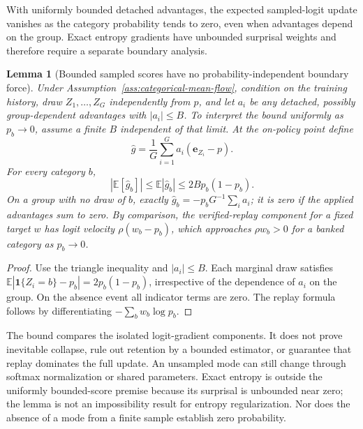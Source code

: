 \documentclass{article}
\newcommand{\enforcehalffinalproseline}{%
  \setlength{\parfillskip}{0pt plus .20\linewidth}}
\newcommand{\1}{\mathbf 1}
\newcommand{\E}{\mathbb E}
\newtheorem{lemma}{Lemma}[section]
\theoremstyle{remark}
\theoremstyle{definition}
\theoremstyle{plain}
\begin{document}
With uniformly bounded detached advantages, the expected sampled-logit
update vanishes as the category probability tends to zero, even when
advantages depend on the group. Exact entropy gradients have unbounded
surprisal weights and therefore require a separate boundary analysis.

\begin{lemma}[Bounded sampled scores have no probability-independent boundary force]
\enforcehalffinalproseline
\label{lem:sampled-score-bound}
Under Assumption~\ref{ass:categorical-mean-flow}, condition on the training history, draw
$Z_1,\ldots,Z_G$ independently from $p$, and let $a_i$ be any detached,
possibly group-dependent advantages with $|a_i|\le B$. To interpret the
bound uniformly as $p_b\to0$, assume a finite $B$ independent of that limit.
At the on-policy point define
\[
 \widehat g=\frac1G\sum_{i=1}^G a_i(\mathbf e_{Z_i}-p).
\]
For every category $b$,
\[
 |\E[\widehat g_b]|\le\E|\widehat g_b|
 \le 2B p_b(1-p_b).
\]
On a group with no draw of $b$, exactly
$\widehat g_b=-p_bG^{-1}\sum_i a_i$; it is zero if the applied advantages
sum to zero. By comparison, the verified-replay component for a fixed target
$w$ has logit velocity $\rho(w_b-p_b)$, which approaches $\rho w_b>0$
for a banked category as $p_b\to0$.
\end{lemma}

\begin{proof}
\enforcehalffinalproseline
Use the triangle inequality and $|a_i|\le B$. Each marginal draw satisfies
$\E|\1\{Z_i=b\}-p_b|=2p_b(1-p_b)$, irrespective of the dependence of
$a_i$ on the group. On the absence event all indicator terms are zero.
The replay formula follows by differentiating $-\sum_b w_b\log p_b$.
\end{proof}

The bound compares the isolated logit-gradient components. It does not prove
inevitable collapse, rule out retention by a bounded estimator, or guarantee
that replay dominates the full update. An unsampled mode can still change
through softmax normalization or shared parameters. Exact entropy is outside
the uniformly bounded-score premise because its surprisal is unbounded near
zero; the lemma is not an impossibility result for entropy regularization.
Nor does the absence of a mode from a finite sample establish zero probability.
\end{document}
